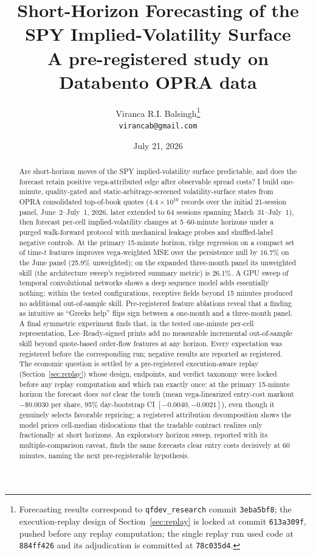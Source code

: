 \documentclass[11pt]{article}
\title{Short-Horizon Forecasting of the SPY Implied-Volatility Surface\\
  \large A pre-registered study on Databento OPRA data}
\author{Viranca R.I. Balsingh\thanks{Forecasting results correspond to
\texttt{qfdev\_research} commit \texttt{3eba5bf8}; the execution-replay
design of Section~\ref{sec:replay} is locked at commit \texttt{613a309f},
pushed before any replay computation; the single replay run used code at
\texttt{884ff426} and its adjudication is committed at \texttt{78c035d4}.}\\
\texttt{virancab@gmail.com}}
\date{July 21, 2026}
\begin{document}
\maketitle

\begin{abstract}
Are short-horizon moves of the SPY implied-volatility surface predictable,
and does the forecast retain positive vega-attributed edge after observable
spread costs? I build one-minute, quality-gated and static-arbitrage-screened
volatility-surface states from OPRA consolidated top-of-book quotes
($4.4\times10^{10}$ records over the initial 21-session panel,
June~2--July~1, 2026, later extended to 64 sessions spanning
March~31--July~1), then forecast per-cell implied-volatility changes at
5--60-minute horizons under a purged walk-forward protocol with mechanical
leakage probes and shuffled-label negative controls. At the primary
15-minute horizon, ridge regression on a compact set of time-$t$ features
improves vega-weighted MSE over the persistence null by 16.7\% on the June
panel (25.9\% unweighted); on the expanded three-month panel its unweighted
skill (the architecture sweep's registered summary metric) is 26.1\%. A GPU sweep of temporal convolutional networks shows a deep
sequence model adds essentially nothing: within the tested configurations,
receptive fields beyond 15 minutes produced no additional out-of-sample
skill. Pre-registered feature ablations reveal that a finding as intuitive
as ``Greeks help'' flips sign between a one-month and a three-month panel.
A final symmetric experiment finds that, in the tested one-minute per-cell
representation, Lee--Ready-signed prints add no measurable incremental
out-of-sample skill beyond quote-based order-flow features at any horizon.
Every expectation was registered before the corresponding run; negative
results are reported as registered. The economic question is settled by a
pre-registered execution-aware replay (Section~\ref{sec:replay}) whose
design, endpoints, and verdict taxonomy were locked before any replay
computation and which ran exactly once: at the primary 15-minute horizon
the forecast does \emph{not} clear the touch (mean vega-linearized
entry-cost markout $-\$0.0030$ per share, 95\% day-bootstrap CI
$[-0.0040, -0.0021]$), even
though it genuinely selects favorable repricing; a registered
attribution decomposition shows the model prices cell-median dislocations
that the tradable contract realizes only fractionally at short horizons.
An exploratory horizon sweep, reported with its multiple-comparison
caveat, finds the same forecasts clear entry costs decisively at 60
minutes, naming the next pre-registerable hypothesis.
\end{abstract}
\end{document}
